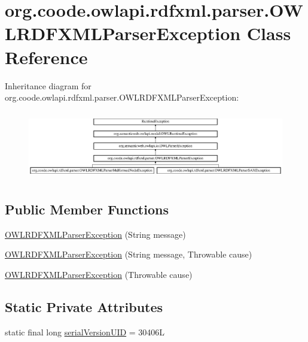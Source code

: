 \hypertarget{classorg_1_1coode_1_1owlapi_1_1rdfxml_1_1parser_1_1_o_w_l_r_d_f_x_m_l_parser_exception}{\section{org.\-coode.\-owlapi.\-rdfxml.\-parser.\-O\-W\-L\-R\-D\-F\-X\-M\-L\-Parser\-Exception Class Reference}
\label{classorg_1_1coode_1_1owlapi_1_1rdfxml_1_1parser_1_1_o_w_l_r_d_f_x_m_l_parser_exception}
}
Inheritance diagram for org.\-coode.\-owlapi.\-rdfxml.\-parser.\-O\-W\-L\-R\-D\-F\-X\-M\-L\-Parser\-Exception\-:\begin{figure}[H]
\begin{center}
\leavevmode
\includegraphics[height=3.017241cm]{classorg_1_1coode_1_1owlapi_1_1rdfxml_1_1parser_1_1_o_w_l_r_d_f_x_m_l_parser_exception}
\end{center}
\end{figure}
\subsection*{Public Member Functions}
\begin{DoxyCompactItemize}
\item 
\hyperlink{classorg_1_1coode_1_1owlapi_1_1rdfxml_1_1parser_1_1_o_w_l_r_d_f_x_m_l_parser_exception_af1f9a79bac0c91a415bcd096e8c11496}{O\-W\-L\-R\-D\-F\-X\-M\-L\-Parser\-Exception} (String message)
\item 
\hyperlink{classorg_1_1coode_1_1owlapi_1_1rdfxml_1_1parser_1_1_o_w_l_r_d_f_x_m_l_parser_exception_aef05914864bbb4f205cac462ec00c688}{O\-W\-L\-R\-D\-F\-X\-M\-L\-Parser\-Exception} (String message, Throwable cause)
\item 
\hyperlink{classorg_1_1coode_1_1owlapi_1_1rdfxml_1_1parser_1_1_o_w_l_r_d_f_x_m_l_parser_exception_aced4f22d48a5c95b29e8523c6ebb7557}{O\-W\-L\-R\-D\-F\-X\-M\-L\-Parser\-Exception} (Throwable cause)
\end{DoxyCompactItemize}
\subsection*{Static Private Attributes}
\begin{DoxyCompactItemize}
\item 
static final long \hyperlink{classorg_1_1coode_1_1owlapi_1_1rdfxml_1_1parser_1_1_o_w_l_r_d_f_x_m_l_parser_exception_abecb83e6198c1d7c25f0bf712c8edeeb}{serial\-Version\-U\-I\-D} = 30406\-L
\end{DoxyCompactItemize}


